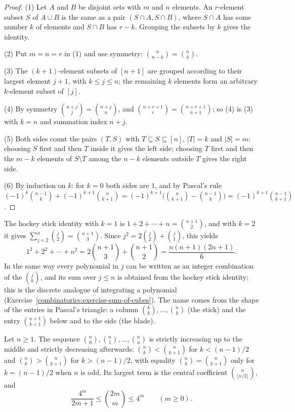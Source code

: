 \begin{proof}
(1) Let $A$ and $B$ be disjoint sets with $m$ and $n$ elements. An $r$-element subset $S$ of $A \cup B$ is the same as a pair $(S \cap A, S \cap B)$, where $S \cap A$ has some number $k$ of elements and
$S \cap B$ has $r - k$. Grouping the subsets by $k$ gives the identity.

(2) Put $m = n = r$ in (1) and use symmetry: $\binom{n}{n - k} = \binom{n}{k}$.

(3) The $(k + 1)$-element subsets of $[n + 1]$ are grouped according to their largest element $j + 1$, with $k \leq j \leq n$; the remaining $k$ elements form an arbitrary $k$-element subset of $[j]$.

(4) By symmetry $\binom{n + j}{j} = \binom{n + j}{n}$, and $\binom{n + r + 1}{r} = \binom{n + r + 1}{n + 1}$; so (4) is (3) with $k = n$ and summation index $n + j$.

(5) Both sides count the pairs $(T, S)$ with $T \subseteq S \subseteq [n]$, $|T| = k$ and $|S| = m$: choosing $S$ first and then $T$ inside it gives the left side; choosing $T$ first and then the
$m - k$ elements of $S \setminus T$ among the $n - k$ elements outside $T$ gives the right side.

(6) By induction on $k$: for $k = 0$ both sides are $1$, and by Pascal's rule
$(-1)^{k}\binom{n-1}{k} + (-1)^{k+1}\binom{n}{k+1} = (-1)^{k+1}\bigl(\binom{n}{k+1} - \binom{n-1}{k}\bigr) = (-1)^{k+1}\binom{n-1}{k+1}$.
\end{proof}

\begin{example}\label{combinatorics:example-hockey-stick}
The hockey stick identity with $k = 1$ is $1 + 2 + \cdots + n = \binom{n + 1}{2}$, and with $k = 2$ it gives $\sum_{j=2}^{n}\binom{j}{2} = \binom{n+1}{3}$. Since $j^2 = 2\binom{j}{2} + \binom{j}{1}$, this
yields
\[
1^2 + 2^2 + \cdots + n^2 = 2\binom{n + 1}{3} + \binom{n + 1}{2} = \frac{n(n + 1)(2n + 1)}{6}.
\]
In the same way every polynomial in $j$ can be written as an integer combination of the $\binom{j}{k}$, and its sum over $j \leq n$ is obtained from the hockey stick identity; this is the discrete
analogue of integrating a polynomial (Exercise~\ref{combinatorics:exercise-sum-of-cubes}). The name comes from the shape of the entries in Pascal's triangle: a column $\binom{k}{k}, \ldots, \binom{n}{k}$
(the stick) and the entry $\binom{n+1}{k+1}$ below and to the side (the blade).
\end{example}

\begin{proposition}[Unimodality]\label{combinatorics:proposition-unimodal}
Let $n \geq 1$. The sequence $\binom{n}{0}, \binom{n}{1}, \ldots, \binom{n}{n}$ is strictly increasing up to the middle and strictly decreasing afterwards: $\binom{n}{k} < \binom{n}{k+1}$ for
$k < (n - 1)/2$ and $\binom{n}{k} > \binom{n}{k+1}$ for $k > (n - 1)/2$, with equality $\binom{n}{k} = \binom{n}{k+1}$ only for $k = (n - 1)/2$ when $n$ is odd. Its largest term is the central
coefficient $\binom{n}{\lfloor n/2 \rfloor}$, and
\[
\frac{4^m}{2m + 1} \leq \binom{2m}{m} \leq 4^m \qquad (m \geq 0).
\]
\end{proposition}

